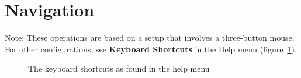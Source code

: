 \documentclass[fleqn,11pt,openany]{book}
\begin{document}
\section{Navigation}
Note: These operations are based on a setup that involves a three-button mouse. For other configurations, see {\bf Keyboard Shortcuts} in the Help menu (figure~\ref{fig:KeyboardShortcuts}).

\begin{figure}
\caption{The keyboard shortcuts as found in the help menu}\label{fig:KeyboardShortcuts}
\end{figure}
\end{document}
